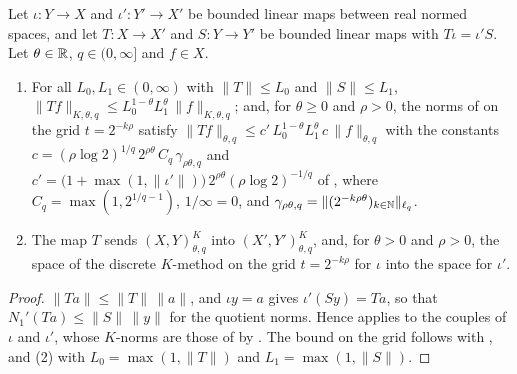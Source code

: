 \begin{proposition}
\label{prop:interpolation-property-map-couples}
\leanok
{}
Let $\iota : Y \to X$ and $\iota' : Y' \to X'$ be bounded linear maps between real normed
spaces, and let $T : X \to X'$ and $S : Y \to Y'$ be bounded linear maps with
$T \iota = \iota' S$. Let $\theta \in \mathbb{R}$, $q \in (0, \infty]$ and $f \in X$.
\begin{enumerate}
  \item For all $L_0, L_1 \in (0, \infty)$ with $\|T\| \leq L_0$ and $\|S\| \leq L_1$,
    $\|Tf\|_{K, \theta, q} \leq L_0^{1-\theta} L_1^{\theta} \, \|f\|_{K, \theta, q}$; and, for
    $\theta \geq 0$ and $\rho > 0$, the norms of  on the grid
    $t = 2^{-k\rho}$ satisfy
    $\|Tf\|_{\theta, q} \leq c' \, L_0^{1-\theta} L_1^{\theta} \, c \, \|f\|_{\theta, q}$ with
    the constants $c = (\rho \log 2)^{1/q} \, 2^{\rho\theta} \, C_q \, \gamma_{\rho\theta, q}$
    and $c' = \bigl(1 + \max(1, \|\iota'\|)\bigr) \, 2^{\rho\theta} (\rho \log 2)^{-1/q}$ of
    , where $C_q = \max(1, 2^{1/q - 1})$, $1/\infty = 0$,
    and $\gamma_{\rho\theta, q} = \|(2^{-k\rho\theta})_{k \in \mathbb{N}}\|_{\ell_q}$.
  \item The map $T$ sends $(X, Y)^K_{\theta, q}$ into $(X', Y')^K_{\theta, q}$, and, for
    $\theta > 0$ and $\rho > 0$, the space of the discrete $K$-method on the grid
    $t = 2^{-k\rho}$ for $\iota$ into the space for $\iota'$.
\end{enumerate}
\end{proposition}

\begin{proof}
\leanok
$\|Ta\| \leq \|T\| \, \|a\|$, and $\iota y = a$ gives $\iota'(Sy) = Ta$, so that
$N_1'(Ta) \leq \|S\| \, \|y\|$ for the quotient norms. Hence 
applies to the couples of $\iota$ and $\iota'$, whose $K$-norms are those of
 by . The bound on the grid follows
with , and (2) with $L_0 = \max(1, \|T\|)$ and
$L_1 = \max(1, \|S\|)$.
\end{proof}

